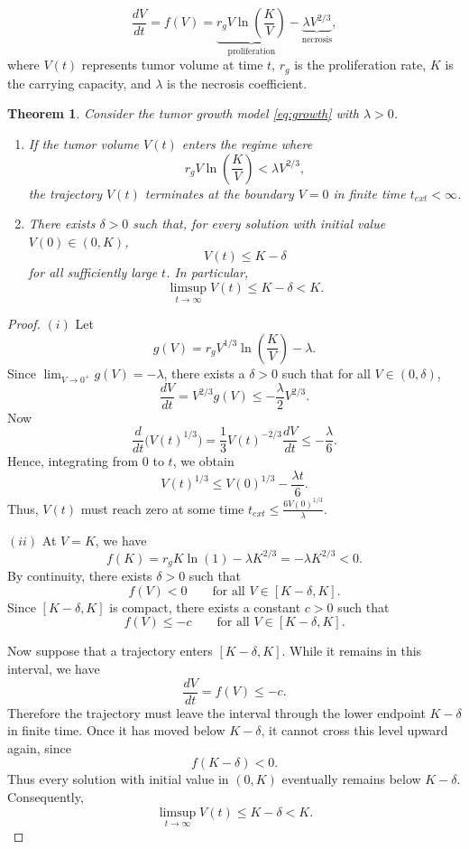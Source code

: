 \documentclass[11pt, reqno]{amsart}
\numberwithin{equation}{section}
\newtheorem{theorem}{Theorem}[section]
\theoremstyle{definition}
\begin{document}
\begin{equation}
\frac{dV}{dt} = f(V)= \underbrace{r_g V \ln\left(\frac{K}{V}\right)}_{\text{proliferation}} - \underbrace{\lambda V^{2/3}}_{\text{necrosis}},
\label{eq:growth}
\end{equation}
where $V(t)$ represents tumor volume at time $t$, $r_g$ is the proliferation rate, $K$ is the carrying capacity, and $\lambda$ is the necrosis coefficient.

\begin{theorem}%
Consider the tumor growth model \eqref{eq:growth} with $\lambda > 0$. 
\begin{enumerate}
    \item[(i)] %
    If the tumor volume $V(t)$ enters the regime where $$r_g V \ln\left(\frac{K}{V}\right) < \lambda V^{2/3},$$ the trajectory $V(t)$ terminates at the boundary $V=0$ in finite time $t_{ext} < \infty$.
    \vspace{0.2cm}
    
    \item[(ii)] %
There exists $\delta>0$ such that, for every solution with initial
value $V(0)\in(0,K)$,
\[
V(t)\le K-\delta
\]
for all sufficiently large $t$. In particular,
\[
\limsup_{t\to\infty}V(t)\le K-\delta<K.
\]
\end{enumerate}
\end{theorem}

\begin{proof}
$(i)$ Let $$g(V) = r_g V^{1/3} \ln\left(\frac{K}{V}\right) - \lambda.$$ Since $\lim_{V \to 0^+} g(V) = -\lambda$, there exists a $\delta > 0$ such that for all $V \in (0, \delta)$, $$\frac{dV}{dt} = V^{2/3} g(V) \leq -\frac{\lambda}{2} V^{2/3}.$$ Now
\[
\frac{d}{dt}\bigl(V(t)^{1/3}\bigr) = \frac{1}{3}V(t)^{-2/3}\frac{dV}{dt} \le - \frac{\lambda}{6}.
\]
Hence, integrating from $0$ to $t$, we obtain
\[
V(t)^{1/3} \le V(0)^{1/3} - \frac{\lambda t}{6}.
\]
Thus, $V(t)$ must reach zero at some time $t_{ext} \leq \frac{6V(0)^{1/3}}{\lambda}$. 
\vspace{0.2cm}

$(ii)$ At $V=K$, we have
\[
f(K)=r_gK\ln(1)-\lambda K^{2/3}
=-\lambda K^{2/3}<0.
\]
By continuity, there exists $\delta>0$ such that
\[
f(V)<0
\qquad \text{for all }V\in[K-\delta,K].
\]
Since $[K-\delta,K]$ is compact, there exists a constant $c>0$ such that
\[
f(V)\le -c
\qquad \text{for all }V\in[K-\delta,K].
\]

Now suppose that a trajectory enters $[K-\delta,K]$. While it remains
in this interval, we have
\[
\frac{dV}{dt}=f(V)\le -c.
\]
Therefore the trajectory must leave the interval through the lower
endpoint $K-\delta$ in finite time. Once it has moved below
$K-\delta$, it cannot cross this level upward again, since
\[
f(K-\delta)<0.
\]
Thus every solution with initial value in $(0,K)$ eventually remains
below $K-\delta$. Consequently,
\[
\limsup_{t\to\infty}V(t)\le K-\delta<K.
\]
\end{proof}
\end{document}
